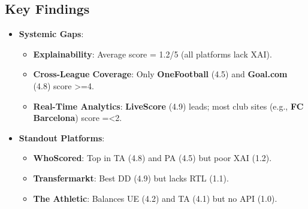 \subsection{Key Findings}
\begin{itemize}
    \item \textbf{Systemic Gaps}:  
    \begin{itemize}
        \item \textbf{Explainability}: Average score = 1.2/5 (all platforms lack XAI).
        \item \textbf{Cross-League Coverage}: Only \textbf{OneFootball} (4.5) and \textbf{Goal.com} (4.8) score >=4.
        \item \textbf{Real-Time Analytics}: \textbf{LiveScore} (4.9) leads; most club sites (e.g., \textbf{FC Barcelona}) score =<2.
    \end{itemize}
    
    \item \textbf{Standout Platforms}:  
    \begin{itemize}
        \item \textbf{WhoScored}: Top in TA (4.8) and PA (4.5) but poor XAI (1.2).
        \item \textbf{Transfermarkt}: Best DD (4.9) but lacks RTL (1.1).
        \item \textbf{The Athletic}: Balances UE (4.2) and TA (4.1) but no API (1.0).
    \end{itemize}
\end{itemize}

